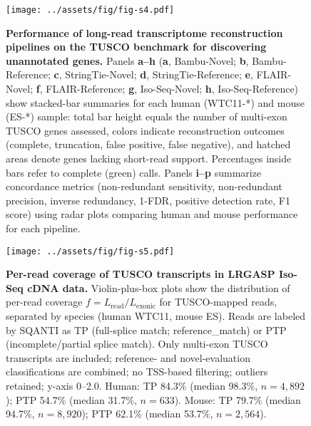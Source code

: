 {  \begin{figure}[htbp]
      \centering
      \texttt{[image: ../assets/fig/fig-s4.pdf]}
      \caption{\textbf{Performance of long-read transcriptome reconstruction pipelines on the TUSCO benchmark for discovering unannotated genes.} Panels \textbf{a--h} (\textbf{a}, Bambu-Novel; \textbf{b}, Bambu-Reference; \textbf{c}, StringTie-Novel; \textbf{d}, StringTie-Reference; \textbf{e}, FLAIR-Novel; \textbf{f}, FLAIR-Reference; \textbf{g}, Iso-Seq-Novel; \textbf{h}, Iso-Seq-Reference) show stacked-bar summaries for each human (WTC11-*) and mouse (ES-*) sample: total bar height equals the number of multi-exon TUSCO genes assessed, colors indicate reconstruction outcomes (complete, truncation, false positive, false negative), and hatched areas denote genes lacking short-read support. Percentages inside bars refer to complete (green) calls. Panels \textbf{i--p} summarize concordance metrics (non-redundant sensitivity, non-redundant precision, inverse redundancy, 1-FDR, positive detection rate, F1 score) using radar plots comparing human and mouse performance for each pipeline.}
      \label{fig:s4}
  \end{figure}

  \clearpage

  \begin{figure}[htbp]
      \centering
      \texttt{[image: ../assets/fig/fig-s5.pdf]}
      \caption{\textbf{Per-read coverage of TUSCO transcripts in LRGASP Iso-Seq cDNA data.} Violin-plus-box plots show the distribution of per-read coverage $f = L_{\text{read}}/L_{\text{exonic}}$ for TUSCO-mapped reads, separated by species (human WTC11, mouse ES). Reads are labeled by SQANTI as TP (full-splice match; reference\_match) or PTP (incomplete/partial splice match). Only multi-exon TUSCO transcripts are included; reference- and novel-evaluation classifications are combined; no TSS-based filtering; outliers retained; y-axis 0--2.0. Human: TP 84.3\% (median 98.3\%, $n=4,892$); PTP 54.7\% (median 31.7\%, $n=633$). Mouse: TP 79.7\% (median 94.7\%, $n=8,920$); PTP 62.1\% (median 53.7\%, $n=2,564$).}
      \label{fig:s5}
  \end{figure}

  \clearpage

}
